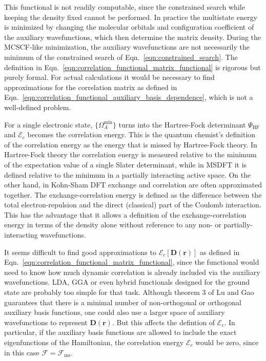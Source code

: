 \documentclass[journal=jpclcd,manuscript=letter]{achemso}
\newcommand\m[1]{\mathbf{#1}}
\renewcommand\vec[1]{\mathbf{#1}}
\begin{document}
This functional is not readily computable, since the constrained search while keeping the density fixed cannot be performed.
In practice the multistate energy is minimized by changing the molecular orbitals and configuration coefficient of the auxiliary
wavefunctions, which then determine the matrix density. During the MCSCF-like minimization,
the auxiliary wavefunctions are not necessarily the minimum of the constrained
search of Eqn.~\ref{eqn:constrained_search}. The definition in Eqn.~\ref{eqn:correlation_functional_matrix_functional}
is rigorous but purely formal. For actual calculations it would be necessary to find approximations for the correlation matrix
as defined in Eqn.~\ref{eqn:correlation_functional_auxiliary_basis_dependence}, which is not a well-defined problem.

For a single electronic state, $\{\Omega_A^{\text{min}}\}$ turns into the Hartree-Fock determinant $\Psi_{\text{HF}}$ and $\mathcal{E}_c$
becomes the correlation energy. This is the quantum chemist's definition of the correlation energy as the energy that is missed by
Hartree-Fock theory. \cite[2.2.7]{Szabo_Ostlund_book}
In Hartree-Fock theory the correlation energy is measured relative to the minimum of the
expectation value of a single Slater determinant, while in MSDFT it is defined relative
to the minimum in a partially interacting active space. \cite{Lu2022JPCL}
On the other hand, in Kohn-Sham DFT exchange and correlation
are often approximated together. The exchange-correlation energy is defined as the difference between the total electron-repulsion
and the direct (classical) part of the Coulomb interaction. \cite{Lieb1979}
This has the advantage that it allows a definition of the exchange-correlation energy in terms of the density alone
without reference to any non- or partially-interacting wavefunctions.

It seems difficult to find good approximations to $\m{\mathcal{E}}_c[\m{D}(\vec{r})]$ as defined in Eqn.~\ref{eqn:correlation_functional_matrix_functional},
since the functional would need to know how much dynamic correlation is already included via
the auxiliary wavefunctions. LDA, GGA or even hybrid functionals designed for the ground state are probably too simple for that task.
Although theorem 3 of Lu and Gao \cite{Lu2022JPCL} guarantees that there is a minimal number of non-orthogonal \cite{Lu2022JPCL}
or orthogonal \cite{Lu2022fundamental} auxiliary basis functions, one could also use a larger space of auxiliary wavefunctions to
represent $\m{D}(\vec{r})$. But this affects the defintion of $\mathcal{E}_{c}$. In particular, if the auxiliary basis functions are
allowed to include the exact eigenfunctions of the Hamiltonian, the correlation energy $\m{\mathcal{E}}_c$ would be zero, since in this case
$\m{\mathcal{F}} = \m{\mathcal{F}}_{\text{ms}}$.
\end{document}
